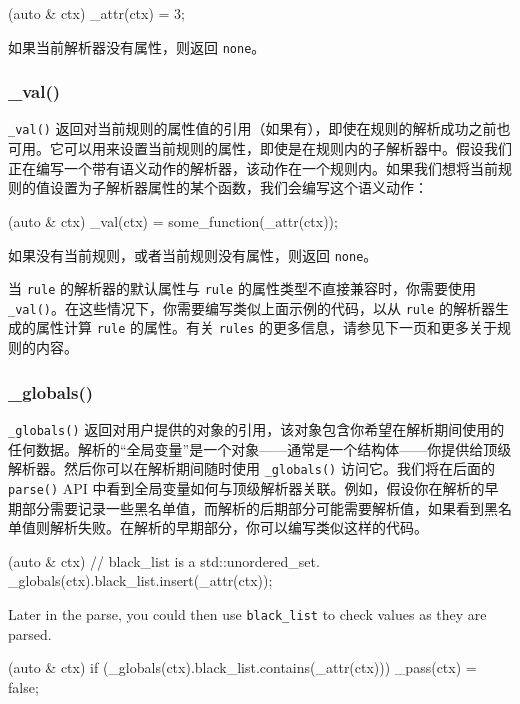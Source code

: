 \begin{code}
[](auto & ctx) { _attr(ctx) = 3; }
\end{code}

如果当前解析器没有属性，则返回 \texttt{none}。

\subsubsection{\_val()}

\texttt{\_val()} 返回对当前规则的属性值的引用（如果有），即使在规则的解析成功之前也可用。它可以用来设置当前规则的属性，即使是在规则内的子解析器中。假设我们正在编写一个带有语义动作的解析器，该动作在一个规则内。如果我们想将当前规则的值设置为子解析器属性的某个函数，我们会编写这个语义动作：

\begin{code}
[](auto & ctx) { _val(ctx) = some_function(_attr(ctx)); }
\end{code}

如果没有当前规则，或者当前规则没有属性，则返回 \texttt{none}。

当 \texttt{rule} 的解析器的默认属性与 \texttt{rule} 的属性类型不直接兼容时，你需要使用 \texttt{\_val()}。在这些情况下，你需要编写类似上面示例的代码，以从 \texttt{rule} 的解析器生成的属性计算 \texttt{rule} 的属性。有关 \texttt{rules} 的更多信息，请参见下一页和更多关于规则的内容。

\subsubsection{\_globals()}

\texttt{\_globals()} 返回对用户提供的对象的引用，该对象包含你希望在解析期间使用的任何数据。解析的“全局变量”是一个对象——通常是一个结构体——你提供给顶级解析器。然后你可以在解析期间随时使用 \texttt{\_globals()} 访问它。我们将在后面的 \texttt{parse()} API 中看到全局变量如何与顶级解析器关联。例如，假设你在解析的早期部分需要记录一些黑名单值，而解析的后期部分可能需要解析值，如果看到黑名单值则解析失败。在解析的早期部分，你可以编写类似这样的代码。

\begin{code}
[](auto & ctx) {
    // black_list is a std::unordered_set.
    _globals(ctx).black_list.insert(_attr(ctx));
}
\end{code}

Later in the parse, you could then use \texttt{black\_list} to check values as they are parsed.

\begin{code}
[](auto & ctx) {
    if (_globals(ctx).black_list.contains(_attr(ctx)))
        _pass(ctx) = false;
}
\end{code}

